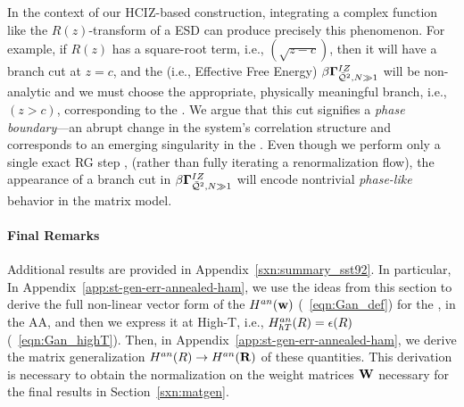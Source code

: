 In the context of our HCIZ-based construction, integrating a complex function like the $R(z)$-transform of
a \HeavyTailed ESD can produce precisely this phenomenon.
For example, if $R(z)$ has a square-root term, i.e., $(\sqrt{z-c})$, then it will have a branch cut at $z=c$,
and the \GeneratingFunction (i.e.,  Effective Free Energy) $\beta\mathbf{\Gamma}^{IZ}_{\bar{\mathcal{Q}}^{2},N\gg 1}$
will be non-analytic and we must choose the appropriate, physically meaningful branch, i.e., $(z>c)$,
corresponding to the \ECS.
We argue that this cut signifies a \emph{phase boundary}—an abrupt change
in the system’s correlation structure and corresponds to an emerging singularity in the \LayerQuality.
Even though we perform only a single exact RG step , 
(rather than fully iterating a renormalization flow), the appearance of a branch cut in $\beta\mathbf{\Gamma}^{IZ}_{\bar{\mathcal{Q}}^{2},N\gg 1}$ will encode
nontrivial \emph{phase-like} behavior in the \SETOL \HeavyTailed matrix model.



\paragraph{Final Remarks}
Additional results are provided in Appendix~\ref{sxn:summary_sst92}. In particular, 
In Appendix~\ref{app:st-gen-err-annealed-ham}, we use the ideas from this section to derive the full non-linear vector form of the \AnnealedHamiltonian $H^{an}({\mathbf{w}})$ (\EQN~\ref{eqn:Gan_def})
for the \LinearPerceptron, in the AA, and then we express it at High-T, i.e.,
$H^{an}_{hT}(R)=\epsilon(R)$ (\EQN~\ref{eqn:Gan_highT}).  
Then, in Appendix~\ref{app:st-gen-err-annealed-ham}, we derive the matrix generalization
$H^{an}(R)\rightarrow H^{an}(\mathbf{R})$ of these quantities.
This derivation is necessary to obtain the normalization on the weight matrices ${\mathbf{W}}$ necessary for the final results in Section~\ref{sxn:matgen}.